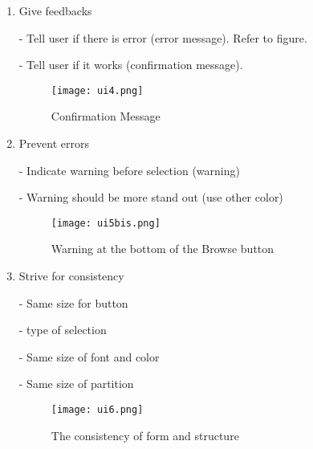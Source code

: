 \documentclass[12pt,a4paper]{article}
\begin{document}
\begin{enumerate}
\item Give feedbacks
	\par - Tell user if there is error (error message). Refer to figure.
	\par - Tell user if it works (confirmation message). 
\begin{figure}[ht]
	\centering
			\texttt{[image: ui4.png]}
	\caption{Confirmation Message}
	\label{fig: confirm }
\end{figure}

\item Prevent errors
	\par - Indicate warning before selection (warning)
	\par - Warning should be more stand out (use other color)
\begin{figure}[ht]
	\centering
			\texttt{[image: ui5bis.png]} 
	\caption{Warning at the bottom of the Browse button}
	\label{fig: warning }
\end{figure}

\item Strive for consistency
	\par - Same size for button
	\par - type of selection
	\par - Same size of font and color
	\par - Same size of partition
	
\begin{figure}[ht]
	\centering
			\texttt{[image: ui6.png]} 
	\caption{The consistency of form and structure}
	\label{fig: form }
\end{figure}
\end{enumerate}


\newpage    
\nocite{*}
\printbibliography
\end{document}
